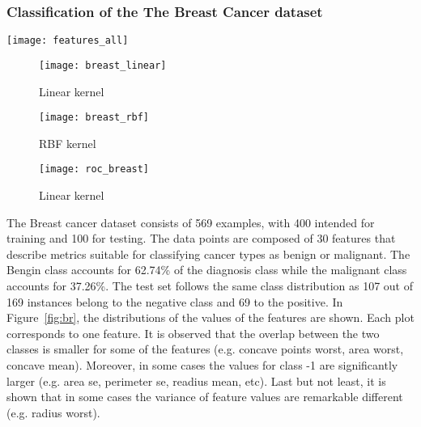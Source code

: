 \documentclass[conference,compsoc]{IEEEtran}
\begin{document}
\subsubsection{Classification of the The Breast Cancer dataset}

\begin{figure*}[]

            \texttt{[image: features\_all]}
      
        \caption{Distribution of features for the Breast cancer dataset }        
                   
        \label{fig:br}
    \end{figure*}
\begin{figure*}[]
        \begin{subfigure}{0.45\linewidth}
            \texttt{[image: breast\_linear]}
            \caption{Linear kernel}
        \end{subfigure}
        \begin{subfigure}{0.45\linewidth}
            \texttt{[image: breast\_rbf]}
            \caption{RBF kernel}
        \end{subfigure}
        \centering
	   \begin{subfigure}{0.45\linewidth}
            \texttt{[image: roc\_breast]}
            \caption{Linear kernel}
        \end{subfigure}
     
                   
\caption{Classifying the Breast cancer dataset}        
        
             
        \label{fig:brf}
    \end{figure*}


The Breast cancer dataset consists of 569 examples, with 400 intended for training and 100 for testing. The data points are composed of 30 features that describe metrics suitable for classifying cancer types as benign or malignant. The Bengin class accounts for 62.74\% of the diagnosis class while the malignant class accounts for 37.26\%. The test set follows the same class distribution as 107 out of 169 instances belong to the negative class and 69 to the positive. In Figure~\ref{fig:br}, the distributions of the values of the features are shown. Each plot corresponds to one feature. It is observed that the overlap between the two classes is smaller for some of the features (e.g. concave points worst, area worst, concave mean). Moreover, in some cases the values for class -1 are significantly larger (e.g. area se, perimeter se, readius mean, etc). Last but not least, it is shown that in some cases the variance of feature values are remarkable different (e.g. radius worst).
\end{document}
